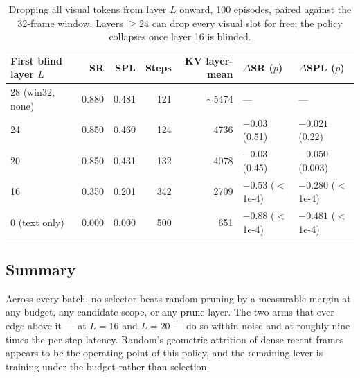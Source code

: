 \begin{table}[ht]
\centering
\begin{tabular}{lrrrrll}
\toprule
First blind layer $L$ & SR & SPL & Steps & KV layer-mean & $\Delta$SR ($p$) & $\Delta$SPL ($p$) \\
\midrule
28 (win32, none) & 0.880 & 0.481 & 121 & $\sim$5474 & --- & --- \\
24               & 0.850 & 0.460 & 124 & 4736 & $-0.03$ (0.51) & $-0.021$ (0.22) \\
20               & 0.850 & 0.431 & 132 & 4078 & $-0.03$ (0.45) & $\mathbf{-0.050}$ (0.003) \\
16               & 0.350 & 0.201 & 342 & 2709 & $-0.53$ ($<$1e-4) & $-0.280$ ($<$1e-4) \\
0 (text only)    & 0.000 & 0.000 & 500 & 651  & $-0.88$ ($<$1e-4) & $-0.481$ ($<$1e-4) \\
\bottomrule
\end{tabular}
\caption{Dropping all visual tokens from layer $L$ onward, 100 episodes, paired against the
32-frame window. Layers $\ge 24$ can drop every visual slot for free; the policy collapses
once layer 16 is blinded.}
\label{tab:kvprune-blind}
\end{table}

\subsection{Summary}
\label{sec:kvprune-summary}

Across every batch, no selector beats random pruning by a measurable margin at any budget,
any candidate scope, or any prune layer. The two arms that ever edge above it --- 
at $L = 16$ and $L = 20$ --- do so within noise and at roughly nine times the per-step
latency. Random's geometric attrition of dense recent frames appears to be the operating
point of this policy, and the remaining lever is training under the budget rather than
selection.
